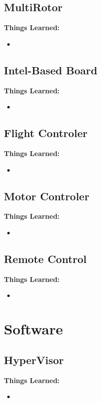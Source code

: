 \documentclass[letterpaper,10pt,notitlepage,fleqn]{article}
\begin{document}
\subsection{MultiRotor}
\indent

\textbf{Things Learned:}
\begin{itemize} 
        \item
    \end{itemize}

\subsection{Intel-Based Board}
\indent
\textbf{Things Learned:}
\begin{itemize} 
        \item
    \end{itemize}

\subsection{Flight Controler}
\indent
\textbf{Things Learned:}
\begin{itemize} 
        \item
    \end{itemize}

\subsection{Motor Controler}
\indent
\textbf{Things Learned:}
\begin{itemize} 
        \item
    \end{itemize}

\subsection{Remote Control}
\indent
\textbf{Things Learned:}
\begin{itemize} 
        \item
    \end{itemize}

\section{Software}

\subsection{HyperVisor}
\indent
\textbf{Things Learned:}
    \begin{itemize} 
        \item
    \end{itemize}
\end{document}
